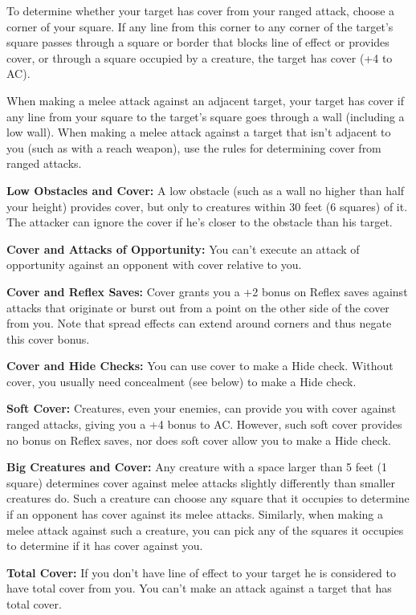 To determine whether your target has cover from your ranged attack, choose a corner 
of your square. If any line from this corner to any corner of the target's square 
passes through a square or border that blocks line of effect or provides cover, 
or through a square occupied by a creature, the target has cover (+4 to AC).

When making a melee attack against an adjacent target, your target has cover if 
any line from your square to the target's square goes through a wall (including 
a low wall). When making a melee attack against a target that isn't adjacent to 
you (such as with a reach weapon), use the rules for determining cover from ranged 
attacks.

\textbf{Low Obstacles and Cover:} A low obstacle (such as a wall no higher than 
half your height) provides cover, but only to creatures within 30 feet (6 squares) 
of it. The attacker can ignore the cover if he's closer to the obstacle than his 
target.

\textbf{Cover and Attacks of Opportunity:} You can't execute an attack of opportunity 
against an opponent with cover relative to you.

\textbf{Cover and Reflex Saves:} Cover grants you a +2 bonus on Reflex saves against 
attacks that originate or burst out from a point on the other side of the cover 
from you. Note that spread effects can extend around corners and thus negate this 
cover bonus.

\textbf{Cover and Hide Checks:} You can use cover to make a Hide check. Without 
cover, you usually need concealment (see below) to make a Hide check.

\textbf{Soft Cover:} Creatures, even your enemies, can provide you with cover against 
ranged attacks, giving you a +4 bonus to AC. However, such soft cover provides 
no bonus on Reflex saves, nor does soft cover allow you to make a Hide check.

\textbf{Big Creatures and Cover:} Any creature with a space larger than 5 feet 
(1 square) determines cover against melee attacks slightly differently than smaller 
creatures do. Such a creature can choose any square that it occupies to determine 
if an opponent has cover against its melee attacks. Similarly, when making a melee 
attack against such a creature, you can pick any of the squares it occupies to 
determine if it has cover against you.

\textbf{Total Cover:} If you don't have line of effect to your target he is considered 
to have total cover from you. You can't make an attack against a target that has 
total cover.

